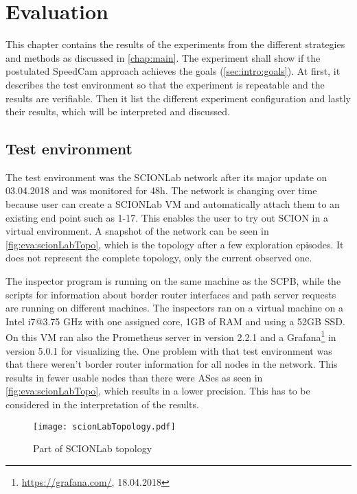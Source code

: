 \documentclass[thesis.tex]{subfiles}
\begin{document}
\chapter{Evaluation}\label{chap:eva}

This chapter contains the results of the experiments from the different strategies and methods as discussed in \autoref{chap:main}. The experiment shall show if the postulated SpeedCam approach achieves the goals (\autoref{sec:intro:goals}). At first, it describes the test environment so that the experiment is repeatable and the results are verifiable. Then it list the different experiment configuration and lastly their results, which will be interpreted and discussed.

\section{Test environment}
The test environment was the SCIONLab network after its major update on 03.04.2018 and was monitored for 48h. The network is changing over time because user can create a SCIONLab VM and automatically attach them to an existing end point such as 1-17. This enables the user to try out SCION in a virtual environment. A snapshot of the network can be seen in \autoref{fig:eva:scionLabTopo}, which is the topology after a few exploration episodes. It does not represent the complete topology, only the current observed one. 

The inspector program is running on the same machine as the SCPB, while the scripts for information about border router interfaces and path server requests are running on different machines. The inspectors ran on a virtual machine on a Intel i7@3.75 GHz with one assigned core, 1GB of RAM and using a 52GB SSD. On this VM ran also the Prometheus server in version 2.2.1 and a Grafana\footnote{{\url{https://grafana.com/}, 18.04.2018}} in version 5.0.1 for visualizing the. One problem with that test environment was that there weren't border router information for all nodes in the network. This results in fewer usable nodes than there were ASes as seen in \autoref{fig:eva:scionLabTopo}, which results in a lower precision. This has to be considered in the interpretation of the results.

\begin{figure}
	\centering
	\texttt{[image: scionLabTopology.pdf]}
	\caption{Part of SCIONLab topology}
	\label{fig:eva:scionLabTopo}
\end{figure}
\end{document}
